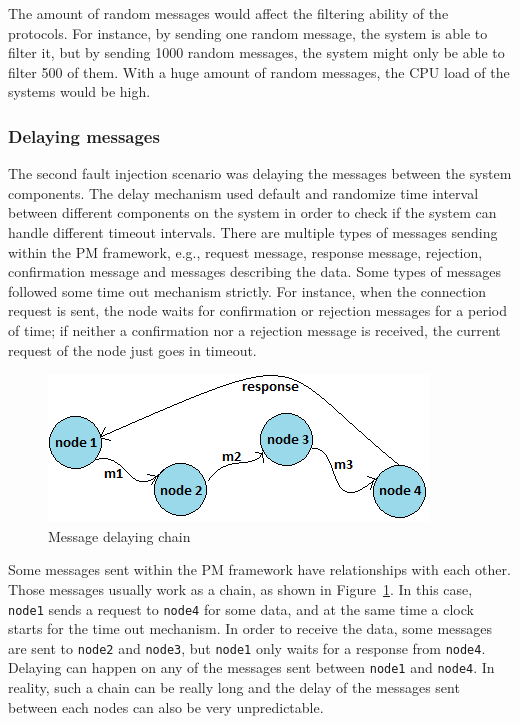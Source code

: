 The amount of random messages would affect the filtering ability of the protocols. For instance, by sending one random message, the system is able to filter it, but by sending 1000 random messages, the system might only be able to filter 500 of them. With a huge amount of random messages, the CPU load of the systems would be high. 

\subsubsection{Delaying messages}
The second fault injection scenario was delaying the messages between the system components. The delay mechanism used default and randomize time interval between different components on the system in order to check if the system can handle different timeout intervals. There are multiple types of messages sending within the PM framework, e.g., request message, response message, rejection, confirmation message and messages describing the data. Some types of messages followed some time out mechanism strictly. For instance, when the connection request is sent, the node waits for confirmation or rejection messages for a period of time; if neither a confirmation nor a rejection message is received, the current request of the node just goes in timeout. 

\begin{figure}[hh!]
\centering
\includegraphics[width=.7\columnwidth]{figure/chaningMSG.png}
\caption{Message delaying chain \label{chaning}}
\end{figure}

Some messages sent within the PM framework have relationships with each other. Those messages usually work as a chain, as shown in Figure~\ref{chaning}. In this case, \texttt{node1} sends a request to \texttt{node4} for some data, and at the same time a clock starts for the time out mechanism. In order to receive the data, some messages are sent to \texttt{node2} and \texttt{node3}, but \texttt{node1} only waits for a response from \texttt{node4}. Delaying can happen on any of the messages sent between \texttt{node1} and \texttt{node4}. In reality, such a chain can be really long and the delay of the messages sent between each nodes can also be very unpredictable.

